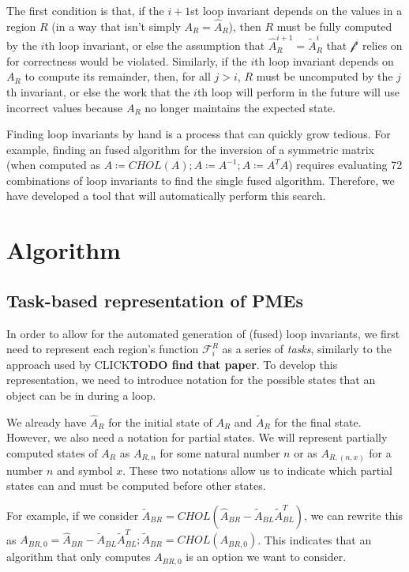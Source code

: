 \documentclass[12pt,letterpaper]{article}
\newcommand*{\opF}{\mathcal{F}}
\newcommand*{\opf}{\mathcal{f}}
\begin{document}
The first condition is that, if the $i + 1$st loop invariant depends on the values in a region $R$ (in a way that isn't simply $A_R = \hat{A}_R$), then $R$ must be fully computed by the $i$th loop invariant, or else the assumption that $\hat{A}^{i + 1}_R = \widetilde{A}^i_R$ that $\opf^i$ relies on for correctness would be violated.
Similarly, if the $i$th loop invariant depends on $A_R$ to compute its remainder, then, for all $j > i$, $R$ must be uncomputed by the $j$th invariant, or else the work that the $i$th loop will perform in the future will use incorrect values because $A_R$ no longer maintains the expected state.

Finding loop invariants by hand is a process that can quickly grow tedious.
For example, finding an fused algorithm for the inversion of a symmetric matrix (when computed as $A \coloneqq CHOL(A); A \coloneqq A^{-1}; A \coloneqq A^TA$) requires evaluating 72 combinations of loop invariants to find the single fused algorithm.
Therefore, we have developed a tool that will automatically perform this search.

\section{Algorithm}

\subsection{Task-based representation of PMEs}
In order to allow for the automated generation of (fused) loop invariants, we first need to represent each region's function $\opF_i^R$ as a series of \emph{tasks}, similarly to the approach used by CLICK\textbf{TODO find that paper}.
To develop this representation, we need to introduce notation for the possible states that an object can be in during a loop.

We already have $\hat{A}_R$ for the initial state of $A_R$ and $\widetilde{A}_R$ for the final state.
However, we also need a notation for partial states.
We will represent partially computed states of $A_R$ as $A_{R, n}$ for some natural number $n$ or as $A_{R, (n, x)}$ for a number $n$ and symbol $x$.
These two notations allow us to indicate which partial states can and must be computed before other states.

For example, if we consider $\widetilde{A}_{BR} = CHOL(\hat{A}_{BR} - \widetilde{A}_{BL}\widetilde{A}_{BL}^T)$, we can rewrite this as $A_{BR, 0} = \hat{A}_{BR} - \widetilde{A}_{BL}\widetilde{A}_{BL}^T; \widetilde{A}_{BR} = CHOL(A_{BR, 0})$.
This indicates that an algorithm that only computes $A_{BR, 0}$ is an option we want to consider.
\end{document}
